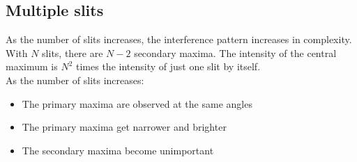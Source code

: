 \subsection{Multiple slits}
As the number of slits increases, the interference pattern increases in complexity. 
With $N$ slits, there are $N-2$ secondary maxima. The intensity of the central maximum is $N^2$ times the intensity of just one slit by itself.\\
As the number of slits increases:
\begin{itemize}
  \item The primary maxima are observed at the same angles
  \item The primary maxima get narrower and brighter
  \item The secondary maxima become unimportant
\end{itemize}
